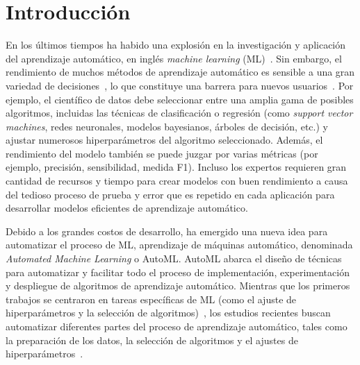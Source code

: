 \chapter*{Introducción}\label{chapter:introduction}

\qquad 

En los últimos tiempos ha habido una explosión en la investigación y aplicación del aprendizaje automático, en inglés \textit{machine learning} (ML)~\cite{hey2020machinelearning}. Sin embargo, el rendimiento de muchos métodos de aprendizaje automático es sensible a una gran variedad de decisiones~\cite{dyrmishi2019decision, radwa2019automated}, lo que constituye una barrera para nuevos usuarios~\cite{crisan2021fits}. Por ejemplo, el científico de datos debe seleccionar entre una amplia gama de posibles algoritmos, incluidas las técnicas de clasificación o regresión (como \textit{support vector machines}, redes neuronales, modelos bayesianos, árboles de decisión, etc.) y ajustar numerosos hiperparámetros del algoritmo seleccionado. Además, el rendimiento del modelo también se puede juzgar por varias métricas (por ejemplo, precisión, sensibilidad, medida F1). Incluso los expertos requieren gran cantidad de recursos y tiempo para crear modelos con buen rendimiento a causa del tedioso proceso de prueba y error que es repetido en cada aplicación para desarrollar modelos eficientes de aprendizaje automático.

Debido a los grandes costos de desarrollo, ha emergido una nueva idea para automatizar el proceso de ML, aprendizaje de máquinas automático, denominada \textit{Automated Machine Learning} o AutoML. AutoML abarca el diseño de técnicas para automatizar y facilitar todo el proceso de implementación, experimentación y despliegue de algoritmos de aprendizaje automático. Mientras que los primeros trabajos se centraron en tareas específicas de ML (como el ajuste de hiperparámetros y la selección de algoritmos)~\cite{thornton2013auto}, los estudios recientes buscan automatizar diferentes partes del proceso de aprendizaje automático, tales como la preparación de los datos, la selección de algoritmos y el ajustes de hiperparámetros~\cite{fuerer2015efficient, olson2019tpot, paszke2019pytorch, chen2018autostacker, swearingen2017atm}.

